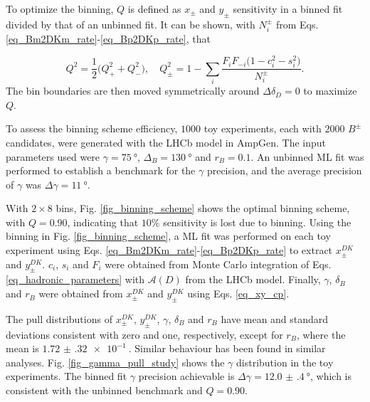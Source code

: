 \documentclass[12pt, a4paper, notitlepage, onecolumn]{article}
\numberwithin{equation}{section}
\begin{document}
To optimize the binning, $Q$ is defined as $x_\pm$ and $y_\pm$ sensitivity in a binned fit divided by that of an unbinned fit. It can be shown, with $N_i^\pm$ from Eqs. \eqref{eq_Bm2DKm_rate}-\eqref{eq_Bp2DKp_rate}, that

\begin{equation}
  Q^2 = \frac{1}{2}\big(Q^2_+ + Q^2_-\big), \quad Q^2_\pm = 1 - \sum_i\frac{F_iF_{-i}\big(1 - c_i^2 - s_i^2\big)}{N_i^\pm}.
  \label{eq_binning_Q}
\end{equation}
The bin boundaries are then moved symmetrically around $\Delta\delta_D = 0$ to maximize $Q$.

To assess the binning scheme efficiency, $1000$ toy experiments, each with $2000$ $B^\pm$ candidates, were generated with the LHCb model in AmpGen. The input parameters used were $\gamma = \SI{75}{\degree}$, $\Delta_B = \SI{130}{\degree}$ and $r_B = 0.1$. An unbinned ML fit was performed to establish a benchmark for the $\gamma$ precision, and the average precision of $\gamma$ was $\Delta\gamma = \SI{11}{\degree}$.

With $2\times 8$ bins, Fig. \ref{fig_binning_scheme} shows the optimal binning scheme, with $Q = 0.90$, indicating that $10\%$ sensitivity is lost due to binning. Using the binning in Fig. \ref{fig_binning_scheme}, a ML fit was performed on each toy experiment using Eqs. \eqref{eq_Bm2DKm_rate}-\eqref{eq_Bp2DKp_rate} to extract $x_\pm^{DK}$ and $y_\pm^{DK}$. $c_i$, $s_i$ and $F_i$ were obtained from Monte Carlo integration of Eqs. \eqref{eq_hadronic_parameters} with $\mathcal{A}(D)$ from the LHCb model. Finally, $\gamma$, $\delta_B$ and $r_B$ were obtained from $x_\pm^{DK}$ and $y_\pm^{DK}$ using Eqs. \eqref{eq_xy_cp}.

The pull distributions of $x_\pm^{DK}$, $y_\pm^{DK}$, $\gamma$, $\delta_B$ and $r_B$ have mean and standard deviations consistent with zero and one, respectively, except for $r_B$, where the mean is $\SI{1.72(32)e-1}{}$. Similar behaviour has been found in similar analyses. Fig. \ref{fig_gamma_pull_study} shows the $\gamma$ distribution in the toy experiments. The binned fit $\gamma$ precision achievable is $\Delta\gamma = \SI{12.0(4)}{\degree}$, which is consistent with the unbinned benchmark and $Q = 0.90$.
\end{document}

